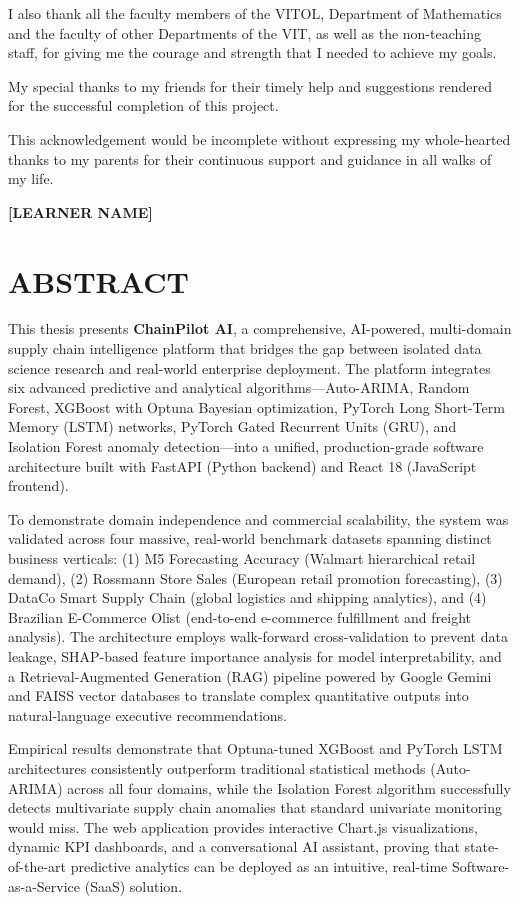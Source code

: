 \documentclass[12pt, a4paper]{report}
\begin{document}
I also thank all the faculty members of the VITOL, Department of Mathematics and the faculty of other Departments of the VIT, as well as the non-teaching staff, for giving me the courage and strength that I needed to achieve my goals.

My special thanks to my friends for their timely help and suggestions rendered for the successful completion of this project.

This acknowledgement would be incomplete without expressing my whole-hearted thanks to my parents for their continuous support and guidance in all walks of my life.

\vspace{0.5in}
\noindent \textbf{[LEARNER NAME]}

\chapter*{ABSTRACT}
This thesis presents \textbf{ChainPilot AI}, a comprehensive, AI-powered, multi-domain supply chain intelligence platform that bridges the gap between isolated data science research and real-world enterprise deployment. The platform integrates six advanced predictive and analytical algorithms---Auto-ARIMA, Random Forest, XGBoost with Optuna Bayesian optimization, PyTorch Long Short-Term Memory (LSTM) networks, PyTorch Gated Recurrent Units (GRU), and Isolation Forest anomaly detection---into a unified, production-grade software architecture built with FastAPI (Python backend) and React 18 (JavaScript frontend).

To demonstrate domain independence and commercial scalability, the system was validated across four massive, real-world benchmark datasets spanning distinct business verticals: (1) M5 Forecasting Accuracy (Walmart hierarchical retail demand), (2) Rossmann Store Sales (European retail promotion forecasting), (3) DataCo Smart Supply Chain (global logistics and shipping analytics), and (4) Brazilian E-Commerce Olist (end-to-end e-commerce fulfillment and freight analysis). The architecture employs walk-forward cross-validation to prevent data leakage, SHAP-based feature importance analysis for model interpretability, and a Retrieval-Augmented Generation (RAG) pipeline powered by Google Gemini and FAISS vector databases to translate complex quantitative outputs into natural-language executive recommendations.

Empirical results demonstrate that Optuna-tuned XGBoost and PyTorch LSTM architectures consistently outperform traditional statistical methods (Auto-ARIMA) across all four domains, while the Isolation Forest algorithm successfully detects multivariate supply chain anomalies that standard univariate monitoring would miss. The web application provides interactive Chart.js visualizations, dynamic KPI dashboards, and a conversational AI assistant, proving that state-of-the-art predictive analytics can be deployed as an intuitive, real-time Software-as-a-Service (SaaS) solution.
\end{document}
